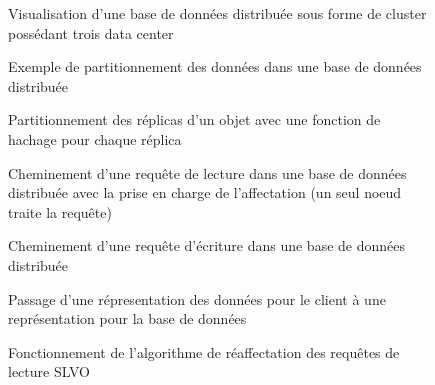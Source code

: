 \documentclass[12pt]{article}
\begin{document}
\begin{figure}[H]
	\centering
		
	\caption{Visualisation d'une base de données distribuée sous forme de cluster possédant trois data center\label{fig:distributed_database}}
\end{figure}

\begin{figure}[H]
	\centering
		
	\caption{Exemple de partitionnement des données dans une base de données distribuée\label{fig:partitionning}}
\end{figure}

\begin{figure}[H]
	\centering
		
	\caption{Partitionnement des réplicas d'un objet avec une fonction de hachage pour chaque réplica\label{fig:multi_hash_partitionning}}
\end{figure}

\begin{figure}[H]
	\centering
		
	\caption{Cheminement d'une requête de lecture dans une base de données distribuée avec la prise en charge de l'affectation (un seul noeud traite la requête)\label{fig:request}}
\end{figure}

\begin{figure}[H]
	\centering
		
	\caption{Cheminement d'une requête d'écriture dans une base de données distribuée\label{fig:write_request}}
\end{figure}

\begin{figure}[H]
	\centering
		
	\caption{Passage d'une répresentation des données pour le client à une représentation pour la base de données\label{fig:token}}
\end{figure}

\begin{figure}[H]
	\centering
		
	\caption{Fonctionnement de l'algorithme de réaffectation des requêtes de lecture SLVO\label{fig:reaffectation}}
\end{figure}
\end{document}

